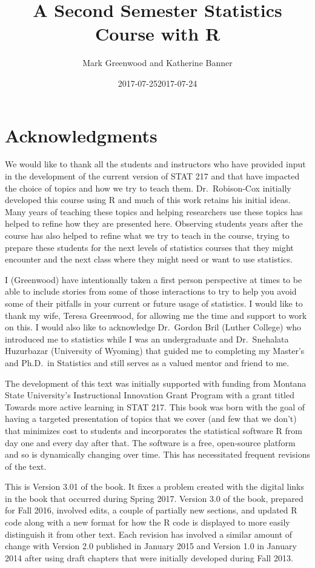 \documentclass[]{book}
\title{A Second Semester Statistics Course with R}
\author{Mark Greenwood and Katherine Banner}
\date{2017-07-25}
\date{2017-07-24}
\theoremstyle{definition}
\theoremstyle{definition}
\theoremstyle{remark}
\begin{document}
\maketitle

{
\setcounter{tocdepth}{1}
\tableofcontents
}
\chapter*{Acknowledgments}\label{acknowledgments}

We would like to thank all the students and instructors who have
provided input in the development of the current version of STAT 217 and
that have impacted the choice of topics and how we try to teach them.
Dr.~Robison-Cox initially developed this course using R and much of this
work retains his initial ideas. Many years of teaching these topics and
helping researchers use these topics has helped to refine how they are
presented here. Observing students years after the course has also
helped to refine what we try to teach in the course, trying to prepare
these students for the next levels of statistics courses that they might
encounter and the next class where they might need or want to use
statistics.

I (Greenwood) have intentionally taken a first person perspective at
times to be able to include stories from some of those interactions to
try to help you avoid some of their pitfalls in your current or future
usage of statistics. I would like to thank my wife, Teresa Greenwood,
for allowing me the time and support to work on this. I would also like
to acknowledge Dr.~Gordon Bril (Luther College) who introduced me to
statistics while I was an undergraduate and Dr.~Snehalata Huzurbazar
(University of Wyoming) that guided me to completing my Master's and
Ph.D.~in Statistics and still serves as a valued mentor and friend to
me.

The development of this text was initially supported with funding from
Montana State University's Instructional Innovation Grant Program with a
grant titled Towards more active learning in STAT 217. This book was
born with the goal of having a targeted presentation of topics that we
cover (and few that we don't) that minimizes cost to students and
incorporates the statistical software R from day one and every day after
that. The software is a free, open-source platform and so is dynamically
changing over time. This has necessitated frequent revisions of the
text.

This is Version 3.01 of the book. It fixes a problem created with the
digital links in the book that occurred during Spring 2017. Version 3.0
of the book, prepared for Fall 2016, involved edits, a couple of
partially new sections, and updated R code along with a new format for
how the R code is displayed to more easily distinguish it from other
text. Each revision has involved a similar amount of change with Version
2.0 published in January 2015 and Version 1.0 in January 2014 after
using draft chapters that were initially developed during Fall 2013.
\end{document}
